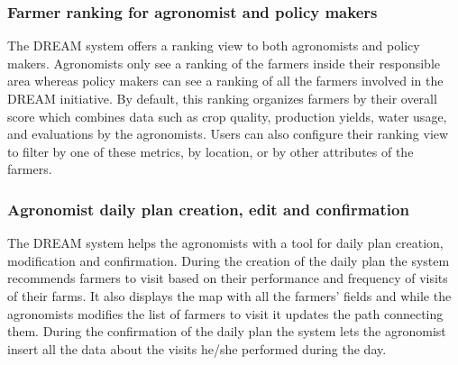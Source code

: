 \subsubsection{Farmer ranking for agronomist and policy makers}
The DREAM system offers a ranking view to both agronomists and policy makers. Agronomists only see a ranking of the farmers inside their responsible area whereas policy makers can see a ranking of all the farmers involved in the DREAM initiative. By default, this ranking organizes farmers by their overall score which combines data such as crop quality, production yields, water usage, and evaluations by the agronomists. Users can also configure their ranking view to filter by one of these metrics, by location, or by other attributes of the farmers. 
\subsubsection{Agronomist daily plan creation, edit and confirmation}
The DREAM system helps the agronomists with a tool for daily plan creation, modification and confirmation. During the creation of the daily plan the system recommends farmers to visit based on their performance and frequency of visits of their farms. It also displays the map with all the farmers' fields and while the agronomists modifies the list of farmers to visit it updates the path connecting them. During the confirmation of the daily plan the system lets the agronomist insert all the data about the visits he/she performed during the day.


